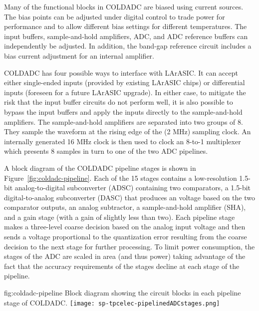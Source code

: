 Many of the functional blocks in COLDADC are biased using current sources.  The bias points can be adjusted under digital control to trade power for performance and to allow different bias settings for different temperatures.  The input buffers, sample-and-hold amplifiers, ADC, and ADC reference buffers can independently be adjusted.  In addition, the band-gap reference circuit includes a bias current adjustment for an internal amplifier.

COLDADC has four possible ways to interface with LArASIC.  It can accept either single-ended inputs (provided by existing LArASIC chips) or differential inputs (foreseen for a future LArASIC upgrade).  In either case, to mitigate the risk that the input buffer circuits do not perform well, it is also possible to bypass the input buffers and apply the inputs directly to the sample-and-hold amplifiers.  The sample-and-hold amplifiers are separated into two groups of 8.  They sample the waveform at the rising edge of the (2 MHz) sampling clock.  An internally generated 16 MHz clock is then used to clock an 8-to-1 multiplexer which presents 8 samples in turn to one of the two ADC pipelines.

A block diagram of the COLDADC pipeline stages is shown in Figure~\ref{fig:coldadc-pipeline}.  Each of the 15 stages contains a low-resolution 1.5-bit analog-to-digital subconverter (ADSC) containing two comparators, a 1.5-bit digital-to-analog subconverter (DASC) that produces an voltage based on the two comparator outputs, an analog subtractor, a sample-and-hold amplifier (SHA), and a gain stage (with a gain of slightly less than two).  Each pipeline stage makes a three-level coarse decision based on the analog input voltage and then sends a voltage proportional to the quantization error resulting from the coarse decision to the next stage for further processing.  To limit power consumption, the stages of the ADC are scaled in area (and thus power) taking advantage of the fact that the accuracy requirements of the stages decline at each stage of the pipeline.

\begin{dunefigure}
{fig:coldadc-pipeline}
{Block diagram showing the circuit blocks in each pipeline stage of COLDADC.}
\texttt{[image: sp-tpcelec-pipelinedADCstages.png]}
\end{dunefigure}


